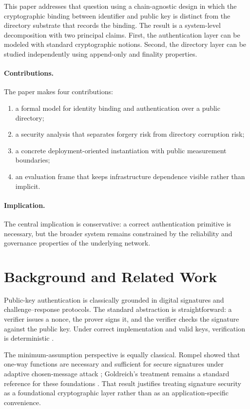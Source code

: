 \documentclass[11pt,a4paper]{article}
\begin{document}
This paper addresses that question using a chain-agnostic design in which the cryptographic binding between identifier and public key is distinct from the directory substrate that records the binding. The result is a system-level decomposition with two principal claims. First, the authentication layer can be modeled with standard cryptographic notions. Second, the directory layer can be studied independently using append-only and finality properties.

\paragraph{Contributions.} The paper makes four contributions:
\begin{enumerate}[leftmargin=*]
  \item a formal model for identity binding and authentication over a public directory;
  \item a security analysis that separates forgery risk from directory corruption risk;
  \item a concrete deployment-oriented instantiation with public measurement boundaries;
  \item an evaluation frame that keeps infrastructure dependence visible rather than implicit.
\end{enumerate}

\paragraph{Implication.} The central implication is conservative: a correct authentication primitive is necessary, but the broader system remains constrained by the reliability and governance properties of the underlying network.

\section{Background and Related Work}

Public-key authentication is classically grounded in digital signatures and challenge--response protocols. The standard abstraction is straightforward: a verifier issues a nonce, the prover signs it, and the verifier checks the signature against the public key. Under correct implementation and valid keys, verification is deterministic \cite{diffie1976,rfc8032}.

The minimum-assumption perspective is equally classical. Rompel showed that one-way functions are necessary and sufficient for secure signatures under adaptive chosen-message attack \cite{rompel1990}; Goldreich's treatment remains a standard reference for these foundations \cite{goldreich2001}. That result justifies treating signature security as a foundational cryptographic layer rather than as an application-specific convenience.
\end{document}
